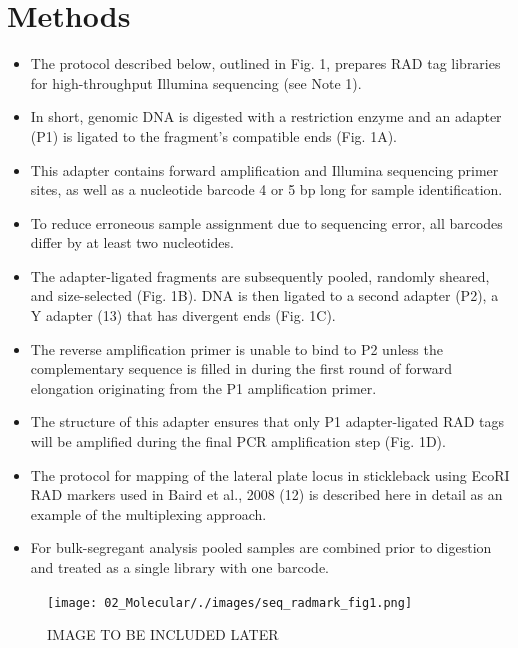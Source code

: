 \documentclass[
  letterpaper,
  DIV=11,
  numbers=noendperiod]{scrreprt}
\providecommand{\tightlist}{%
  \setlength{\itemsep}{0pt}\setlength{\parskip}{0pt}}\usepackage{longtable,booktabs,array}
\begin{document}
\hypertarget{methods}{%
\section{Methods}\label{methods}}

\begin{itemize}
\tightlist
\item
  The protocol described below, outlined in Fig. 1, prepares RAD tag
  libraries for high-throughput Illumina sequencing (see Note 1).
\item
  In short, genomic DNA is digested with a restriction enzyme and an
  adapter (P1) is ligated to the fragment's compatible ends (Fig. 1A).
\item
  This adapter contains forward amplification and Illumina sequencing
  primer sites, as well as a nucleotide barcode 4 or 5 bp long for
  sample identification.
\item
  To reduce erroneous sample assignment due to sequencing error, all
  barcodes differ by at least two nucleotides.
\item
  The adapter-ligated fragments are subsequently pooled, randomly
  sheared, and size-selected (Fig. 1B). DNA is then ligated to a second
  adapter (P2), a Y adapter (13) that has divergent ends (Fig. 1C).
\item
  The reverse amplification primer is unable to bind to P2 unless the
  complementary sequence is filled in during the first round of forward
  elongation originating from the P1 amplification primer.
\item
  The structure of this adapter ensures that only P1 adapter-ligated RAD
  tags will be amplified during the final PCR amplification step (Fig.
  1D).
\item
  The protocol for mapping of the lateral plate locus in stickleback
  using EcoRI RAD markers used in Baird et al., 2008 (12) is described
  here in detail as an example of the multiplexing approach.
\item
  For bulk-segregant analysis pooled samples are combined prior to
  digestion and treated as a single library with one barcode.
\end{itemize}

\begin{figure}

{\centering \texttt{[image: 02\_Molecular/./images/seq\_radmark\_fig1.png]}

}

\caption{IMAGE TO BE INCLUDED LATER}

\end{figure}
\end{document}
